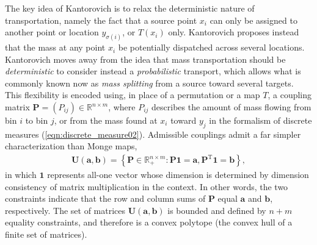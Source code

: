 \documentclass[11pt]{book}
\begin{document}
The key idea of Kantorovich is to relax the deterministic nature of transportation, namely the fact that a source point \(x_i\) can only be assigned to another point or location \(y_{\sigma(i)}\), or \(T(x_i)\) only. Kantorovich proposes instead that the mass at any point \(x_i\) be potentially dispatched across several locations. Kantorovich moves away from the idea that mass transportation should be \textit{deterministic} to consider instead a \textit{probabilistic} transport, which allows what is commonly known now as \textit{mass splitting} from a source toward several targets. This flexibility is encoded using, in place of a permutation or a map \(T\), a coupling matrix \(\mathbf{P} = (P_{ij}) \in \mathbb{R}^{n \times m}\), where \(P_{ij}\) describes the amount of mass flowing from bin \(i\) to bin \(j\), or from the mass found at \(x_i\) toward \(y_j\) in the formalism of discrete measures (\ref{eqn:discrete_measure02}). Admissible couplings admit a far simpler characterization than Monge maps,
\begin{align}
\mathbf{U}(\mathbf{a}, \mathbf{b}) = \left\{ \mathbf{P} \in \mathbb{R}_+^{n \times m} : \mathbf{P}\mathbf{1} = \mathbf{a},  \mathbf{P}^{\text{T}}\mathbf{1} = \mathbf{b} \right\}, 
\end{align}
in which $\mathbf{1}$ represents all-one vector whose dimension is determined by dimension consistency of matrix multiplication in the context. In other words, the two constraints indicate that the row and column sums of $\mathbf{P}$ equal $\mathbf{a}$ and $\mathbf{b}$, respectively. The set of matrices \( \mathbf{U}(\mathbf{a}, \mathbf{b})  \) is bounded and defined by \( n+m \) equality constraints, and therefore is a convex polytope (the convex hull of a finite set of matrices).
\end{document}
